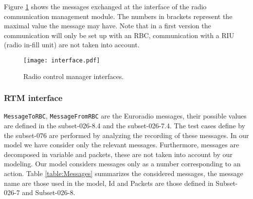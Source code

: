 \label{subsec:inputoutput}

Figure \ref{fig:interfaces} shows the messages exchanged at the interface of
the radio communication management module. The numbers in brackets represent the maximal value the message
may have. Note that in a first version the communication will only be set up
with an RBC, communication with a RIU (radio in-fill unit) are not taken
into account.

\begin{figure}[htpb]
\centering
\texttt{[image: interface.pdf]}
\caption{\label{fig:interfaces} Radio control manager interfaces.}
\end{figure}

\subsubsection{RTM interface}
\verb+MessageToRBC+, \verb+MessageFromRBC+ are the Euroradio messages, their
possible values are defined in the subset-026-8.4 and the subset-026-7.4. The
test cases define by the subset-076 are performed by analyzing the recording of
these messages. In our model we have consider only the relevant messages.
Furthermore, messages are decomposed in variable and packets, these are not
taken into account by our modeling. Our model considers messages only as a number corresponding to an action. 
Table \ref{table:Messages} summarizes the considered messages, the message name
are those used in the model, Id and Packets are those defined in Subset-026-7
and Subset-026-8.

